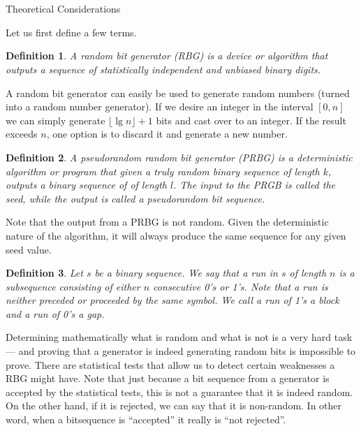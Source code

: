 \documentclass[a4paper]{article}           %
\newtheorem{mydef}{Definition}
\newcommand{\tmpsection}[1]{}
\let\tmpsection=\section
\renewcommand{\section}[2]{

    \ifthenelse{
      \equal{#2}{Heimildir} %
    }
    {
      \tmpsection{\sc{#1} }
      \tmpsection{\sc{#2} }
    }
    {\tmpsection{\sc{#1} } }
      

}
\begin{document}
\section{Related Work -  Background}




\section{Theoretical Considerations}

Let us first define a few terms\cite{menezes1996}.

\begin{mydef}
A random bit generator (RBG) is a device or algorithm that outputs a sequence of statistically independent and unbiased binary digits.   
\end{mydef}

A random bit generator can easily be used to generate random numbers (turned into a random number generator). If we desire an integer in the interval $[0, n]$ we can simply generate $\lfloor \lg n \rfloor + 1$ bits and cast over to an integer. If the result exceeds $n$, one option is to discard it and generate a new number. 

\begin{mydef}
  
  A pseudorandom random bit generator (PRBG) is a deterministic algorithm or program that given a truly random binary sequence of length $k$, outputs a binary sequence of of length $l$. The input to the PRGB is called the seed, while the output is called a pseudorandom bit sequence. 

  
\end{mydef}

Note that the output from a PRBG is not random. Given the deterministic nature of the algorithm, it will always produce the same sequence for any given seed value. 

\begin{mydef}
Let $s$ be a binary sequence. We say that a run in $s$ of length $n$ is a subsequence consisting of either $n$ consecutive 0's or 1's. Note that a run is neither preceded or proceeded by the same symbol. We call a run of 1's a block and a run of 0's a gap. 
\end{mydef}

Determining mathematically what is random and what is not is a very hard task --- and proving that a generator is indeed generating random bits is impossible to prove\cite{menezes1996}. There are statistical tests that allow us to detect certain weaknesses a RBG might have. Note that just because a bit sequence from a generator is accepted by the statistical tests, this is not a guarantee that it is indeed random. On the other hand, if it is rejected, we can say that it is non-random. In other word, when a bitsequence is ``accepted'' it really is ``not rejected''. 
\end{document}
